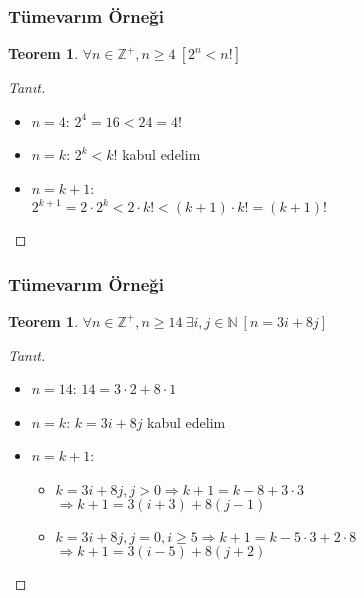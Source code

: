 \documentclass[dvipsnames]{beamer}
\theoremstyle{definition}
\theoremstyle{example}
\theoremstyle{plain}
\newtheorem{teorem}[theorem]{Teorem}
\begin{document}
\begin{frame}
  \frametitle{Tümevarım Örneği}

  \begin{teorem}
    $\forall n \in \mathbb{Z}^+, n \geq 4~[2^n < n!]$
  \end{teorem}

  \pause
  \begin{proof}[Tanıt]
    \begin{itemize}
      \item $n=4$: $2^4=16<24=4!$

      \pause
      \item $n=k$: $2^k < k!$ kabul edelim

      \pause
      \item $n=k+1$:\\
        $2^{k+1} = 2 \cdot 2^k < 2 \cdot k! < (k+1) \cdot k! = (k+1)!$
    \end{itemize}
  \end{proof}
\end{frame}

\begin{frame}
  \frametitle{Tümevarım Örneği}

  \begin{teorem}
    $\forall n \in \mathbb{Z}^+, n \geq 14~\exists i,j \in \mathbb{N}~[n=3i+8j]$
  \end{teorem}

  \pause
  \begin{proof}[Tanıt]
    \begin{itemize}
      \item $n=14$: $14=3 \cdot 2 + 8 \cdot 1$

      \pause
      \item $n=k$: $k=3i+8j$ kabul edelim

      \pause
      \item $n=k+1$:
      \begin{itemize}
        \item $k=3i+8j, j>0 \Rightarrow k+1=k-8+3 \cdot 3$\\
          $\Rightarrow k+1=3(i+3)+8(j-1)$
        \item $k=3i+8j, j=0, i \geq 5 \Rightarrow k+1=k-5 \cdot 3+2 \cdot 8$\\
          $\Rightarrow k+1=3(i-5)+8(j+2)$
      \end{itemize}
    \end{itemize}
  \end{proof}
\end{frame}
\end{document}
